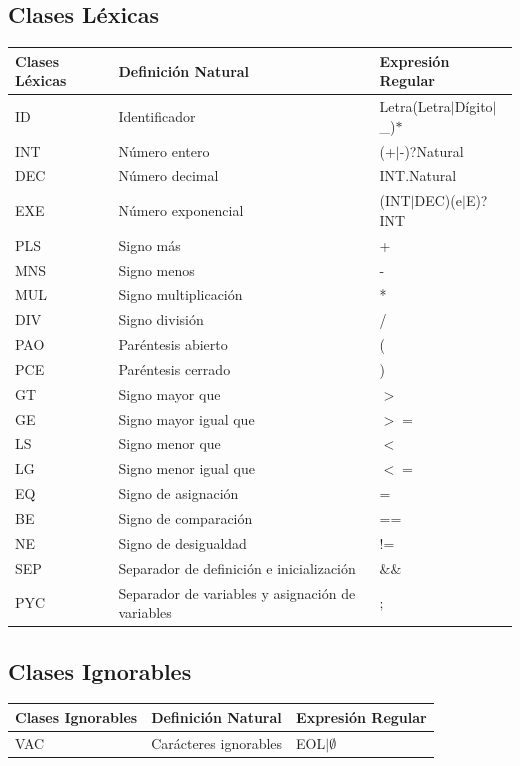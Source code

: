 \documentclass{article}
\begin{document}
\subsection{Clases Léxicas}
\begin{center}
    \begin{tabular}{ | p{2cm} | p{5cm} | p{4cm} |}
    \hline
     Clases Léxicas & Definición Natural & Expresión Regular \\ \hline
     ID & Identificador & Letra(Letra$\mid$Dígito$\mid$\_)$*$ \\ \hline
     INT & Número entero & (+$\mid$-)?Natural \\ \hline
     DEC & Número decimal &  INT.Natural \\ \hline
     EXE & Número exponencial  & (INT$\mid$DEC)(e$\mid$E)?INT  \\ \hline
     PLS & Signo más & + \\ \hline
     MNS & Signo menos & - \\ \hline
     MUL & Signo multiplicación & * \\ \hline
     DIV & Signo división & / \\ \hline
     PAO & Paréntesis abierto & ( \\ \hline
      PCE & Paréntesis cerrado & ) \\ \hline
      GT & Signo mayor que & $>$\\ \hline
      GE & Signo mayor igual que & $>=$ \\ \hline
      LS & Signo menor que & $<$\\ \hline
      LG & Signo menor igual que & $<=$ \\ \hline
      EQ & Signo de asignación & = \\ \hline
      BE & Signo de comparación & == \\ \hline
      NE & Signo de desigualdad & !=  \\ \hline
			SEP & Separador de definición e inicialización & \&\& \\ \hline
			PYC & Separador de variables y asignación de variables & $;$ \\ \hline
    \end{tabular}
\end{center}
\subsection{Clases Ignorables}
\begin{center}
    \begin{tabular}{ | p{2cm} | p{5cm} | p{4cm} |}
    \hline
    Clases Ignorables & Definición Natural & Expresión Regular \\ \hline
    VAC & Carácteres ignorables & EOL$\mid \emptyset$ \\ \hline
    \end{tabular}
\end{center}
\end{document}

